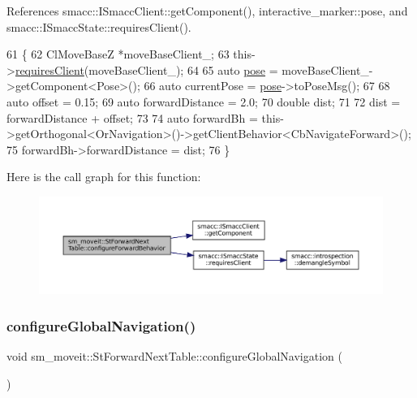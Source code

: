 References smacc\+::\+I\+Smacc\+Client\+::get\+Component(), interactive\+\_\+marker\+::pose, and smacc\+::\+I\+Smacc\+State\+::requires\+Client().


\begin{DoxyCode}
61   \{
62     ClMoveBaseZ *moveBaseClient\_;
63     this->\hyperlink{classsmacc_1_1ISmaccState_a7f95c9f0a6ea2d6f18d1aec0519de4ac}{requiresClient}(moveBaseClient\_);
64 
65     \textcolor{keyword}{auto} \hyperlink{namespaceinteractive__marker_a06e4691dc5f93e0da6dc9a6efa8d99b5}{pose} = moveBaseClient\_->getComponent<Pose>();
66     \textcolor{keyword}{auto} currentPose = \hyperlink{namespaceinteractive__marker_a06e4691dc5f93e0da6dc9a6efa8d99b5}{pose}->toPoseMsg();
67 
68     \textcolor{keyword}{auto} offset = 0.15;
69     \textcolor{keyword}{auto} forwardDistance = 2.0;
70     \textcolor{keywordtype}{double} dist;
71     
72     dist = forwardDistance + offset;
73 
74     \textcolor{keyword}{auto} forwardBh = this->getOrthogonal<OrNavigation>()->getClientBehavior<CbNavigateForward>();
75     forwardBh->forwardDistance = dist;
76   \}
\end{DoxyCode}
Here is the call graph for this function\+:
\nopagebreak
\begin{figure}[H]
\begin{center}
\leavevmode
\includegraphics[width=350pt]{structsm__moveit_1_1StForwardNextTable_a6ecfa1c16ac130f4063cea5a90325b66_cgraph}
\end{center}
\end{figure}
\mbox{\label{structsm__moveit_1_1StForwardNextTable_ac3b63f25fad5cecd8faa51b427719d07}} 
\subsubsection{\texorpdfstring{configure\+Global\+Navigation()}{configureGlobalNavigation()}}
{\footnotesize\ttfamily void sm\+\_\+moveit\+::\+St\+Forward\+Next\+Table\+::configure\+Global\+Navigation (\begin{DoxyParamCaption}{ }\end{DoxyParamCaption})\hspace{0.3cm}{\ttfamily [inline]}}



